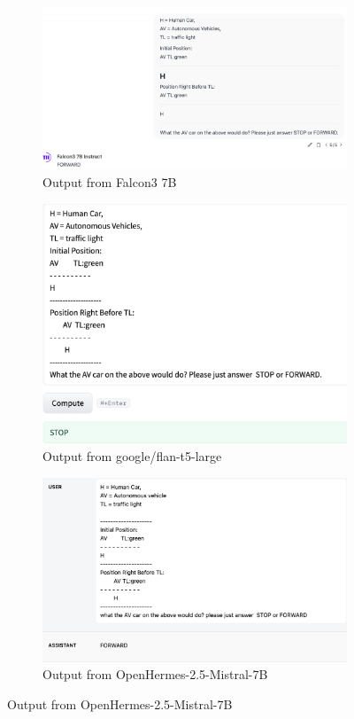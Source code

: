 \documentclass[conference]{IEEEtran}
\begin{document}
\begin{figure}[h]
    \begin{subfigure}[b]{0.3\textwidth}
        \includegraphics[width=\linewidth]{outfromLLM/Falcon3.png}
        \caption{Output from Falcon3 7B}
    \end{subfigure}
    \begin{subfigure}[b]{0.3\textwidth}
        \includegraphics[width=\linewidth]{outfromLLM/google:flan-t5-large.png}
        \caption{Output from google/flan-t5-large}
    \end{subfigure}
    \begin{subfigure}[b]{0.3\textwidth}
        \includegraphics[width=\linewidth]{outfromLLM/FROM_LLM.png}
        \caption{Output from OpenHermes-2.5-Mistral-7B}
    \end{subfigure}


\end{figure}
\end{document}
